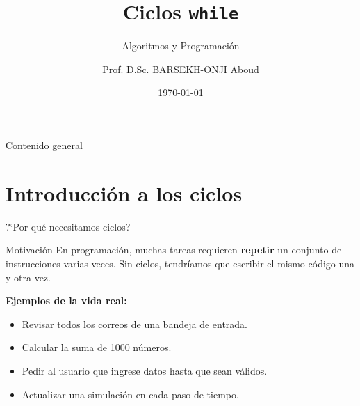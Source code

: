 \documentclass[aspectratio=169,xcolor=dvipsnames]{beamer}
\title{Ciclos \texttt{while}}
\subtitle{Algoritmos y Programaci\'on}
\author{Prof. D.Sc. BARSEKH-ONJI Aboud}
\institute{
    Facultad de Ingenier\'ia \\
    Universidad An\'ahuac M\'exico
}
\date{\today}
\begin{document}
\begin{frame}
    \titlepage
\end{frame}

\begin{frame}{Contenido general}
    \tableofcontents
\end{frame}

\section{Introducci\'on a los ciclos}

\begin{frame}{?`Por qu\'e necesitamos ciclos?}
    \begin{block}{Motivaci\'on}
        En programaci\'on, muchas tareas requieren \textbf{repetir} un conjunto de instrucciones
        varias veces. Sin ciclos, tendr\'iamos que escribir el mismo c\'odigo una y otra vez.
    \end{block}
    \vspace{0.3cm}
    \textbf{Ejemplos de la vida real:}
    \begin{itemize}
        \item Revisar todos los correos de una bandeja de entrada.
        \item Calcular la suma de 1000 n\'umeros.
        \item Pedir al usuario que ingrese datos hasta que sean v\'alidos.
        \item Actualizar una simulaci\'on en cada paso de tiempo.
    \end{itemize}
\end{frame}
\end{document}
